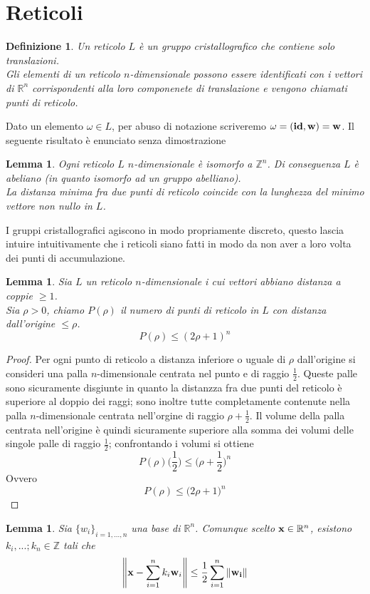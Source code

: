 \documentclass[a4paper,11pt,openright,twoside	]{book}
\newtheorem{definition}{Definizione}[section]
\newtheorem{lemma}[theorem]{Lemma}
\begin{document}
\section{Reticoli}
\begin{definition}
Un reticolo $L$ è un gruppo cristallografico che contiene solo translazioni. \\
Gli elementi di un reticolo $n$-dimensionale possono essere identificati con i vettori di $\mathbb{R}^n$ corrispondenti alla loro componenete di translazione e vengono chiamati punti di reticolo. 
\end{definition}
Dato un elemento $\omega \in L$, per abuso di notazione scriveremo $\omega = (\vb{id, w} ) = \vb{w}$. 
Il seguente risultato è enunciato senza dimostrazione 
\begin{lemma}
Ogni reticolo $L$ $n$-dimensionale è isomorfo a $\mathbb{Z}^n$. Di conseguenza $L$ è abeliano (in quanto isomorfo ad un gruppo abelliano).\\
La distanza minima fra due punti di reticolo coincide con la lunghezza del minimo vettore non nullo in $L$.  
\end{lemma}
I gruppi cristallografici agiscono in modo propriamente discreto, questo lascia intuire intuitivamente che i reticoli siano fatti in modo da non aver a loro volta dei punti di accumulazione. 
\begin{lemma}
\label{lemma:rho}
Sia $L$ un reticolo $n$-dimensionale i cui vettori abbiano distanza a coppie $\geq 1$. \\
Sia $\rho >0$, chiamo $P(\rho)$ il numero di punti di reticolo in $L$ con distanza dall'origine $\leq \rho$. 
\[ P(\rho) \leq (2 \rho +1)^n\]
\end{lemma}
\begin{proof}
Per ogni punto di reticolo a distanza inferiore o uguale di $\rho$ dall'origine si consideri una palla $n$-dimensionale centrata nel punto e di raggio $\frac{1}{2}$. Queste palle sono sicuramente disgiunte in quanto la distanzza fra due punti del reticolo è superiore al doppio dei raggi; sono inoltre tutte completamente contenute nella palla $n$-dimensionale centrata nell'orgine di raggio $ \rho + \frac{1}{2}$. 
Il volume della palla centrata nell'origine è quindi sicuramente superiore alla somma dei volumi delle singole palle di raggio $\frac{1}{2}$; confrontando i volumi si ottiene
\[ P(\rho) \bigg(  \frac{1}{2} \bigg) \leq \bigg( \rho + \frac{1}{2} \bigg)^n \]
Ovvero
\[ P(\rho) \leq \bigg( 2 \rho + 1 \bigg)^n \]
\end{proof}
\begin{lemma}
\label{lemma:somma}
Sia $\{w_i \}_{i=1,...,n}$ una base di $\mathbb{R}^n$. Comunque scelto $\vb{x} \in \mathbb{R}^n$, esistono $k_i, ...; k_n \in \mathbb{Z}$ tali che 
\[ \norm{\vb{x} - \sum_{i=1}^{n} k_i \vb{w}_i} \leq \frac{1}{2} \sum_{i=1}^{n} \norm{\vb{w_i}} \] 
\end{lemma}
\end{document}
